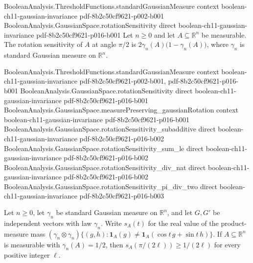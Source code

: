 \begin{lemma}
\leanok
{}
\proofstep
  {BooleanAnalysis.ThresholdFunctions.standardGaussianMeasure}
  {context}
  {boolean-ch11-gaussian-invariance}
  {pdf-8b2c50cf9621-p002-b001}
\proofstep
  {BooleanAnalysis.GaussianSpace.rotationSensitivity}
  {direct}
  {boolean-ch11-gaussian-invariance}
  {pdf-8b2c50cf9621-p016-b001}
Let $n\ge 0$ and let $A\subseteq\mathbb R^n$ be measurable. The rotation sensitivity of
$A$ at angle $\pi/2$ is $2\gamma_n(A)\bigl(1-\gamma_n(A)\bigr)$, where $\gamma_n$ is
standard Gaussian measure on $\mathbb R^n$.
\end{lemma}

\begin{theorem}
\leanok
{}
\proofstep
  {BooleanAnalysis.ThresholdFunctions.standardGaussianMeasure}
  {context}
  {boolean-ch11-gaussian-invariance}
  {pdf-8b2c50cf9621-p002-b001,
    pdf-8b2c50cf9621-p016-b001}
\proofstep
  {BooleanAnalysis.GaussianSpace.rotationSensitivity}
  {direct}
  {boolean-ch11-gaussian-invariance}
  {pdf-8b2c50cf9621-p016-b001}
\proofstep
  {BooleanAnalysis.GaussianSpace.measurePreserving_gaussianRotation}
  {context}
  {boolean-ch11-gaussian-invariance}
  {pdf-8b2c50cf9621-p016-b001}
\proofstep
  {BooleanAnalysis.GaussianSpace.rotationSensitivity_subadditive}
  {direct}
  {boolean-ch11-gaussian-invariance}
  {pdf-8b2c50cf9621-p016-b002}
\proofstep
  {BooleanAnalysis.GaussianSpace.rotationSensitivity_sum_le}
  {direct}
  {boolean-ch11-gaussian-invariance}
  {pdf-8b2c50cf9621-p016-b002}
\proofstep
  {BooleanAnalysis.GaussianSpace.rotationSensitivity_div_nat}
  {direct}
  {boolean-ch11-gaussian-invariance}
  {pdf-8b2c50cf9621-p016-b002}
\proofstep
  {BooleanAnalysis.GaussianSpace.rotationSensitivity_pi_div_two}
  {direct}
  {boolean-ch11-gaussian-invariance}
  {pdf-8b2c50cf9621-p016-b003}

Let $n\ge0$, let $\gamma_n$ be standard Gaussian measure on $\mathbb R^n$, and let $G,G\prime$ be independent vectors with law $\gamma_n$. Write $s_A(t)$ for the real value of the product-measure mass $(\gamma_n\otimes\gamma_n)\{(g,h):\mathbf1_A(g)\ne\mathbf1_A(\cos t\,g+\sin t\,h)\}$. If $A\subseteq\mathbb R^n$ is measurable with $\gamma_n(A)=1/2$, then $s_A(\pi/(2\ell))\ge1/(2\ell)$ for every positive integer $\ell$.
\end{theorem}

